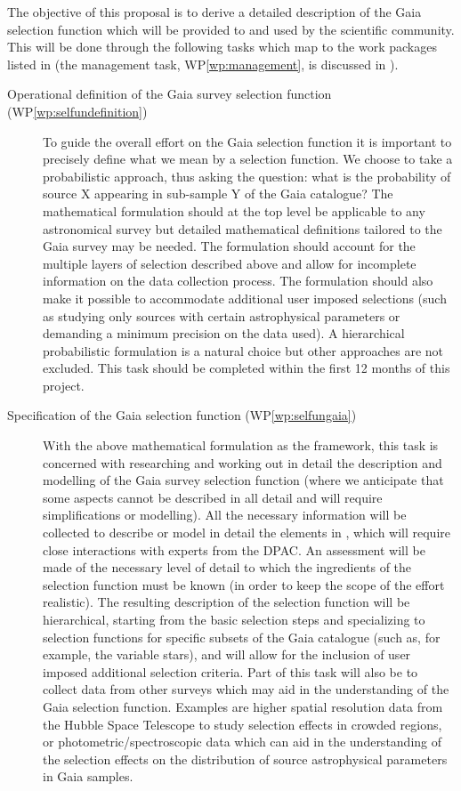 The objective of this proposal is to derive a detailed description of the Gaia selection function which will be provided to and used by the scientific community. This will be done through the following tasks which map to the work packages listed in  (the management task, WP\ref{wp:management}, is discussed in ).

\begin{description}
    \item[Operational definition of the Gaia survey selection function (WP\ref{wp:selfundefinition})] To guide the overall effort on the Gaia selection function it is important to precisely define what we mean by a selection function. We choose to take a probabilistic approach, thus asking the question: what is the probability of source X appearing in sub-sample Y of the Gaia catalogue? The mathematical formulation should at the top level be applicable to any astronomical survey but detailed mathematical definitions tailored to the Gaia survey may be needed. The formulation should account for the multiple layers of selection described above and allow for incomplete information on the data collection process. The formulation should also make it possible to accommodate additional user imposed selections (such as studying only sources with certain astrophysical parameters or demanding a minimum precision on the data used). A hierarchical probabilistic formulation is a natural choice but other approaches are not excluded. This task should be completed within the first 12 months of this project.
    \item[Specification of the Gaia selection function (WP\ref{wp:selfungaia})] With the above mathematical formulation as the framework, this task is concerned with researching and working out in detail the description and modelling of the Gaia survey selection function (where we anticipate that some aspects cannot be described in all detail and will require simplifications or modelling). All the necessary information will be collected to describe or model in detail the elements in , which will require close interactions with experts from the DPAC. An assessment will be made of the necessary level of detail to which the ingredients of the selection function must be known (in order to keep the scope of the effort realistic). The resulting description of the selection function will be hierarchical, starting from the basic selection steps and specializing to selection functions for specific subsets of the Gaia catalogue (such as, for example, the variable stars), and will allow for the inclusion of user imposed additional selection criteria. Part of this task will also be to collect data from other surveys which may aid in the understanding of the Gaia selection function. Examples are higher spatial resolution data from the Hubble Space Telescope to study selection effects in crowded regions, or photometric/spectroscopic data which can aid in the understanding of the selection effects on the distribution of source astrophysical parameters in Gaia samples.

\end{description}

